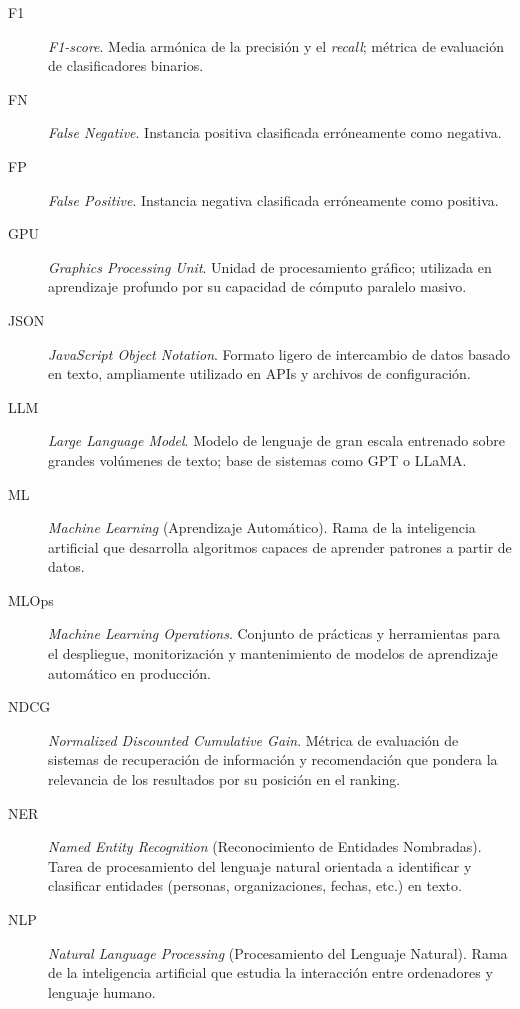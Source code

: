 \begin{description}
  \item[F1] \textit{F1-score}. Media armónica de la precisión y el \textit{recall}; métrica de evaluación de clasificadores binarios.

  \item[FN] \textit{False Negative}. Instancia positiva clasificada erróneamente como negativa.

  \item[FP] \textit{False Positive}. Instancia negativa clasificada erróneamente como positiva.

  \item[GPU] \textit{Graphics Processing Unit}. Unidad de procesamiento gráfico; utilizada en aprendizaje profundo por su capacidad de cómputo paralelo masivo.

  \item[JSON] \textit{JavaScript Object Notation}. Formato ligero de intercambio de datos basado en texto, ampliamente utilizado en APIs y archivos de configuración.

  \item[LLM] \textit{Large Language Model}. Modelo de lenguaje de gran escala entrenado sobre grandes volúmenes de texto; base de sistemas como GPT o LLaMA.

  \item[ML] \textit{Machine Learning} (Aprendizaje Automático). Rama de la inteligencia artificial que desarrolla algoritmos capaces de aprender patrones a partir de datos.

  \item[MLOps] \textit{Machine Learning Operations}. Conjunto de prácticas y herramientas para el despliegue, monitorización y mantenimiento de modelos de aprendizaje automático en producción.

  \item[NDCG] \textit{Normalized Discounted Cumulative Gain}. Métrica de evaluación de sistemas de recuperación de información y recomendación que pondera la relevancia de los resultados por su posición en el ranking.

  \item[NER] \textit{Named Entity Recognition} (Reconocimiento de Entidades Nombradas). Tarea de procesamiento del lenguaje natural orientada a identificar y clasificar entidades (personas, organizaciones, fechas, etc.) en texto.

  \item[NLP] \textit{Natural Language Processing} (Procesamiento del Lenguaje Natural). Rama de la inteligencia artificial que estudia la interacción entre ordenadores y lenguaje humano.


\end{description}
